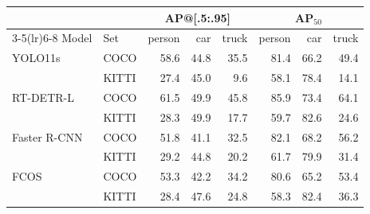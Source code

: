 \begin{tabular}{llrrrrrr}
\toprule
 & & \multicolumn{3}{c}{AP@[.5:.95]} & \multicolumn{3}{c}{AP$_{50}$} \\
\cmidrule(lr){3-5}\cmidrule(lr){6-8}
Model & Set & person & car & truck & person & car & truck \\
\midrule
YOLO11s & COCO & 58.6 & 44.8 & 35.5 & 81.4 & 66.2 & 49.4 \\
 & KITTI & 27.4 & 45.0 & 9.6 & 58.1 & 78.4 & 14.1 \\
\midrule
RT-DETR-L & COCO & 61.5 & 49.9 & 45.8 & 85.9 & 73.4 & 64.1 \\
 & KITTI & 28.3 & 49.9 & 17.7 & 59.7 & 82.6 & 24.6 \\
\midrule
Faster R-CNN & COCO & 51.8 & 41.1 & 32.5 & 82.1 & 68.2 & 56.2 \\
 & KITTI & 29.2 & 44.8 & 20.2 & 61.7 & 79.9 & 31.4 \\
\midrule
FCOS & COCO & 53.3 & 42.2 & 34.2 & 80.6 & 65.2 & 53.4 \\
 & KITTI & 28.4 & 47.6 & 24.8 & 58.3 & 82.4 & 36.3 \\
\bottomrule
\end{tabular}
